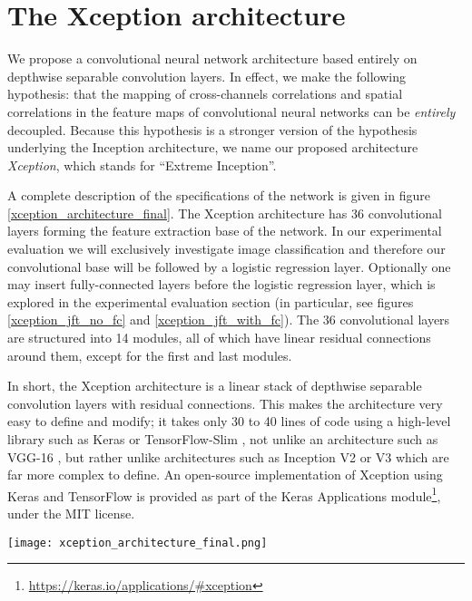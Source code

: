 \documentclass[10pt,twocolumn,letterpaper]{article}
\begin{document}
\section{The Xception architecture}

We propose a convolutional neural network architecture based entirely on depthwise separable convolution layers. In effect, we make the following hypothesis: that the mapping of cross-channels correlations and spatial correlations in the feature maps of convolutional neural networks can be \textit{entirely} decoupled. Because this hypothesis is a stronger version of the hypothesis underlying the Inception architecture, we name our proposed architecture \textit{Xception}, which stands for ``Extreme Inception''.

A complete description of the specifications of the network is given in figure \ref{xception_architecture_final}. The Xception architecture has 36 convolutional layers forming the feature extraction base of the network. In our experimental evaluation we will exclusively investigate image classification and therefore our convolutional base will be followed by a logistic regression layer. Optionally one may insert fully-connected layers before the logistic regression layer, which is explored in the experimental evaluation section (in particular, see figures \ref{xception_jft_no_fc} and \ref{xception_jft_with_fc}). The 36 convolutional layers are structured into 14 modules, all of which have linear residual connections around them, except for the first and last modules.

In short, the Xception architecture is a linear stack of depthwise separable convolution layers with residual connections. This makes the architecture very easy to define and modify; it takes only 30 to 40 lines of code using a high-level library such as Keras \cite{chollet2015keras} or TensorFlow-Slim \cite{tfslim}, not unlike an architecture such as VGG-16 \cite{simonyan2014very}, but rather unlike architectures such as Inception V2 or V3 which are far more complex to define. An open-source implementation of Xception using Keras and TensorFlow is provided as part of the Keras Applications module\footnote{\url{https://keras.io/applications/\#xception}}, under the MIT license.

\begin{figure*}
  \caption{The Xception architecture: the data first goes through the entry flow, then through the middle flow which is repeated eight times, and finally through the exit flow. Note that all Convolution and SeparableConvolution layers are followed by batch normalization \cite{ioffe2015batch} (not included in the diagram). All SeparableConvolution layers use a depth multiplier of 1 (no depth expansion).}
  \label{xception_architecture_final}
  \centering
    \texttt{[image: xception\_architecture\_final.png]}
\end{figure*}
\end{document}
